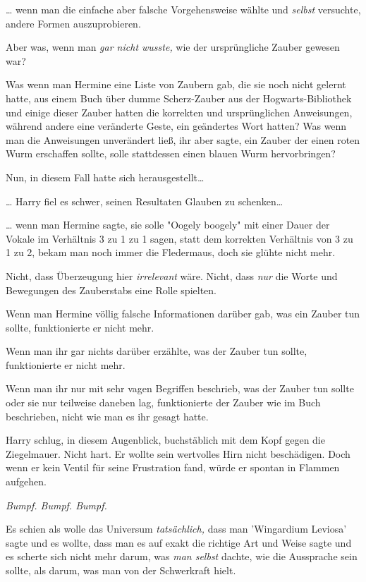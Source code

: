 {… wenn man die einfache aber falsche Vorgehensweise wählte und \emph{selbst} versuchte, andere Formen auszuprobieren.

Aber was, wenn man \emph{gar nicht wusste,} wie der ursprüngliche Zauber gewesen war?

Was wenn man Hermine eine Liste von Zaubern gab, die sie noch nicht gelernt hatte, aus einem Buch über dumme Scherz-Zauber aus der Hogwarts-Bibliothek und einige dieser Zauber hatten die korrekten und ursprünglichen Anweisungen, während andere eine veränderte Geste, ein geändertes Wort hatten? Was wenn man die Anweisungen unverändert ließ, ihr aber sagte, ein Zauber der einen roten Wurm erschaffen sollte, solle stattdessen einen blauen Wurm hervorbringen?

Nun, in diesem Fall hatte sich herausgestellt…

… Harry fiel es schwer, seinen Resultaten Glauben zu schenken…

… wenn man Hermine sagte, sie solle "Oogely boogely" mit einer Dauer der Vokale im Verhältnis 3 zu 1 zu 1 sagen, statt dem korrekten Verhältnis von 3 zu 1 zu 2, bekam man noch immer die Fledermaus, doch sie glühte nicht mehr.

Nicht, dass Überzeugung hier \emph{irrelevant} wäre. Nicht, dass \emph{nur} die Worte und Bewegungen des Zauberstabs eine Rolle spielten.

Wenn man Hermine völlig falsche Informationen darüber gab, was ein Zauber tun sollte, funktionierte er nicht mehr.

Wenn man ihr gar nichts darüber erzählte, was der Zauber tun sollte, funktionierte er nicht mehr.

Wenn man ihr nur mit sehr vagen Begriffen beschrieb, was der Zauber tun sollte oder sie nur teilweise daneben lag, funktionierte der Zauber wie im Buch beschrieben, nicht wie man es ihr gesagt hatte.

Harry schlug, in diesem Augenblick, buchstäblich mit dem Kopf gegen die Ziegelmauer. Nicht hart. Er wollte sein wertvolles Hirn nicht beschädigen. Doch wenn er kein Ventil für seine Frustration fand, würde er spontan in Flammen aufgehen.

\emph{Bumpf. Bumpf. Bumpf.}

Es schien als wolle das Universum \emph{tatsächlich,} dass man 'Wingardium Leviosa' sagte und es wollte, dass man es auf exakt die richtige Art und Weise sagte und es scherte sich nicht mehr darum, was \emph{man selbst} dachte, wie die Aussprache sein sollte, als darum, was man von der Schwerkraft hielt.

}
